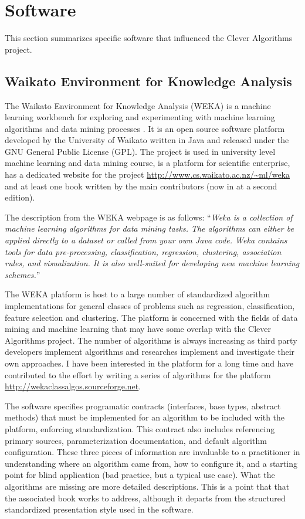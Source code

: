 \documentclass[a4paper, 11pt]{article}
\begin{document}
% 
% 
\section{Software}
\label{sec:software}
This section summarizes specific software that influenced the Clever Algorithms project.

% 
% 
\subsection{Waikato Environment for Knowledge Analysis}
The Waikato Environment for Knowledge Analysis (WEKA) is a machine learning workbench for exploring and experimenting with machine learning algorithms and data mining processes \cite{Hall2009}. It is an open source software platform developed by the University of Waikato written in Java and released under the GNU General Public License (GPL). The project is used in university level machine learning and data mining course, is a platform for scientific enterprise, has a dedicated website for the project \url{http://www.cs.waikato.ac.nz/~ml/weka} and at least one book written by the main contributors \cite{Witten2000} (now in at a second edition).

The description from the WEKA webpage is as follows: ``\emph{Weka is a collection of machine learning algorithms for data mining tasks. The algorithms can either be applied directly to a dataset or called from your own Java code. Weka contains tools for data pre-processing, classification, regression, clustering, association rules, and visualization. It is also well-suited for developing new machine learning schemes.}''

The WEKA platform is host to a large number of standardized algorithm implementations for general classes of problems such as regression, classification, feature selection and clustering. The platform is concerned with the fields of data mining and machine learning that may have some overlap with the Clever Algorithms project. The number of algorithms is always increasing as third party developers implement algorithms and researches implement and investigate their own approaches. I have been interested in the platform for a long time and have contributed to the effort by writing a series of algorithms for the platform \url{http://wekaclassalgos.sourceforge.net}. 

The software specifies programatic contracts (interfaces, base types, abstract methods) that must be implemented for an algorithm to be included with the platform, enforcing standardization. This contract also includes referencing primary sources, parameterization documentation, and default algorithm configuration. These three pieces of information are invaluable to a practitioner in understanding where an algorithm came from, how to configure it, and a starting point for blind application (bad practice, but a typical use case). 
What the algorithms are missing are more detailed descriptions. This is a point that that the associated book works to address, although it departs from the structured standardized presentation style used in the software.
\end{document}
